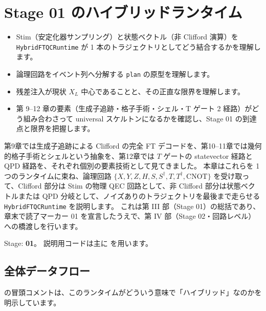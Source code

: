 \chapter{Stage 01 のハイブリッドランタイム}\label{ch:stage_a_runtime}

\begin{chaptergoal}
  \begin{itemize}
  \item Stim（安定化器サンプリング）と状態ベクトル（非 Clifford 演算）を \texttt{HybridFTQCRuntime} が 1 本のトラジェクトリとしてどう結合するかを理解します。
  \item 論理回路をイベント列へ分解する \texttt{plan} の原型を理解します。
  \item 残差注入が現状 $X_L$ 中心であることと、その正直な限界を理解します。
  \item 第 9--12 章の要素（生成子追跡・格子手術・シェル・T ゲート 2 経路）がどう組み合わさって universal スケルトンになるかを確認し、Stage 01 の到達点と限界を把握します。
  \end{itemize}
\end{chaptergoal}

第9章では生成子追跡による Clifford の完全 FT デコードを、第10--11章では幾何的格子手術とシェルという抽象を、第12章では $T$ ゲートの statevector 経路と QPD 経路を、それぞれ個別の要素技術として見てきました。
本章はこれらを 1 つのランタイムに束ね、論理回路 $\{X,Y,Z,H,S,S^\dagger,T,T^\dagger,\mathrm{CNOT}\}$ を受け取って、Clifford 部分は Stim の物理 QEC 回路として、非 Clifford 部分は状態ベクトルまたは QPD 分岐として、ノイズありのトラジェクトリを最後まで走らせる \texttt{HybridFTQCRuntime} を説明します。
これは第 III 部（Stage 01）の総括であり、章末で読了マーカー 01 を宣言したうえで、第 IV 部（Stage 02・回路レベル）への橋渡しを行います。

\begin{notebox}
  Stage: \textbf{01}。
  説明用コードは主に  を用います。
\end{notebox}

\section{全体データフロー}\label{sec:dataflow}

 の冒頭コメントは、このランタイムがどういう意味で「ハイブリッド」なのかを明示しています。

